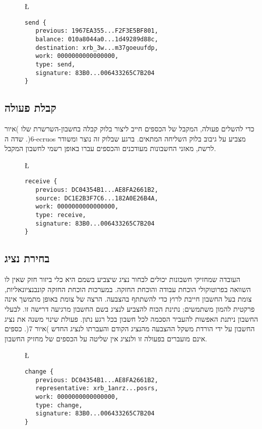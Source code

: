 \begin{figure}[!ht]
\L {
\begin{lstlisting}
send {
   previous: 1967EA355...F2F3E5BF801,
   balance: 010a8044a0...1d49289d88c,
   destination: xrb_3w...m37goeuufdp,
   work: 0000000000000000,
   type: send,
   signature: 83B0...006433265C7B204
}
\end{lstlisting}
\label{code:send}
}
\end{figure}

\subsection{קבלת פעולה}\label{sec:receive}
כדי להשלים פעולה, המקבל של הכספים חייב ליצור בלוק קבלה בחשבון-השרשרת שלו )איור 6(. שדה ה-ecruos מצביע על גיבוב בלוק השליחה המתאים. ברגע שבלוק זה נוצר ומשודר לרשת, מאזני החשבונות מעודכנים והכספים עברו באופן רשמי לחשבון המקבל.

\begin{figure}[!ht]
\L {
\begin{lstlisting}
receive {
   previous: DC04354B1...AE8FA2661B2,
   source: DC1E2B3F7C6...182A0E26B4A,
   work: 0000000000000000,
   type: receive,
   signature: 83B0...006433265C7B204
}
\end{lstlisting}
\label{code:receive}
}
\end{figure}

\subsection{בחירת נציג}\label{sec:change}
העובדה שמחזיקי חשבונות יכולים לבחור נציג שיצביע בשמם היא כלי ביזור חזק שאין לו השוואה בפרוטוקולי הוכחת עבודה והוכחת החזקה. במערכות הוכחת החזקה קונבנציונאליות, צומת בעל החשבון חייבת לרוץ כדי להשתתף בהצבעה. הרצה של צומת באופן מתמשך אינה פרקטית להמון משתמשים; נתינת הכוח להצביע לנציג בשם החשבון מרגיעה דרישה זו. לבעלי החשבון ניתנת האפשות להעביר הסכמה לכל חשבון בכל רגע נתון. פעולת שינוי משנה את נציג החשבון על ידי הורדת משקל ההצבעה מהנציג הקודם והעברתו לנציג החדש )איור 7(. כספים אינם מועברים בפעולה זו ולנציג אין שליטה על הכספים של מחזיק החשבון.

\begin{figure}[!ht]
\L {
\begin{lstlisting}
change {
   previous: DC04354B1...AE8FA2661B2,
   representative: xrb_1anrz...posrs,
   work: 0000000000000000,
   type: change,
   signature: 83B0...006433265C7B204
}
\end{lstlisting}
\label{code:change}
}
\end{figure}

